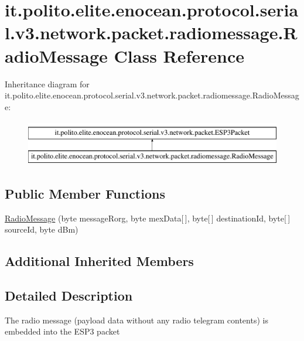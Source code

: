 \hypertarget{classit_1_1polito_1_1elite_1_1enocean_1_1protocol_1_1serial_1_1v3_1_1network_1_1packet_1_1radiomessage_1_1_radio_message}{}\section{it.\+polito.\+elite.\+enocean.\+protocol.\+serial.\+v3.\+network.\+packet.\+radiomessage.\+Radio\+Message Class Reference}
\label{classit_1_1polito_1_1elite_1_1enocean_1_1protocol_1_1serial_1_1v3_1_1network_1_1packet_1_1radiomessage_1_1_radio_message}
Inheritance diagram for it.\+polito.\+elite.\+enocean.\+protocol.\+serial.\+v3.\+network.\+packet.\+radiomessage.\+Radio\+Message\+:\begin{figure}[H]
\begin{center}
\leavevmode
\includegraphics[height=2.000000cm]{classit_1_1polito_1_1elite_1_1enocean_1_1protocol_1_1serial_1_1v3_1_1network_1_1packet_1_1radiomessage_1_1_radio_message}
\end{center}
\end{figure}
\subsection*{Public Member Functions}
\begin{DoxyCompactItemize}
\item 
\hyperlink{classit_1_1polito_1_1elite_1_1enocean_1_1protocol_1_1serial_1_1v3_1_1network_1_1packet_1_1radiomessage_1_1_radio_message_a094ff2aa926bb7fa2be5a0b36e9c87ea}{Radio\+Message} (byte message\+Rorg, byte mex\+Data\mbox{[}$\,$\mbox{]}, byte\mbox{[}$\,$\mbox{]} destination\+Id, byte\mbox{[}$\,$\mbox{]} source\+Id, byte d\+Bm)
\end{DoxyCompactItemize}
\subsection*{Additional Inherited Members}


\subsection{Detailed Description}
The radio message (payload data without any radio telegram contents) is embedded into the E\+S\+P3 packet

